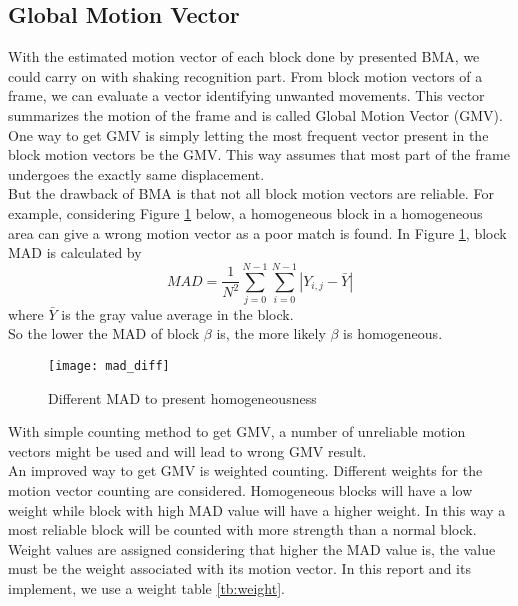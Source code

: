 \documentclass[a4paper, twocolumn]{article}
\begin{document}
	\subsection{Global Motion Vector}
	With the estimated motion vector of each block done by presented BMA, we could carry on with shaking recognition part.
	From block motion vectors of a frame, we can evaluate a vector identifying unwanted movements. This vector summarizes the motion of the frame and is called Global Motion Vector (GMV).\\
	One way to get GMV is simply letting the most frequent vector present in the block motion vectors be the GMV. This way assumes that most part of the frame undergoes the exactly same displacement. \\
	But the drawback of BMA is that not all block motion vectors are reliable. For example, considering Figure \ref{fig:mad_diff} below, a homogeneous block in a homogeneous area can give a wrong motion vector as a poor match is found. In Figure \ref{fig:mad_diff}, block MAD is calculated by
	\begin{equation}
		MAD = \frac{1}{N^2} \sum_{j=0}^{N-1} \sum_{i=0}^{N-1} | Y_{i,j} - \bar{Y} |
	\end{equation}
	where $ \bar{Y} $ is the gray value average in the block. \\
	So the lower the MAD of block $ \beta $ is, the more likely $ \beta $ is homogeneous.
	\begin{figure}[h]
	\centering
	\texttt{[image: mad\_diff]}
	\caption{Different MAD to present homogeneousness}
	\label{fig:mad_diff}
	\end{figure}
	
	\noindent
	With simple counting method to get GMV, a number of unreliable motion vectors might be used and will lead to wrong GMV result.\\
	An improved way to get GMV is weighted counting. Different weights for the motion vector counting are considered. Homogeneous blocks will have a low weight while block with high MAD value will have a higher weight. In this way a most reliable block will be counted with more strength than a normal block.\\
	Weight values are assigned considering that higher the MAD value is, the value must be the weight associated with its motion vector. In this report and its implement, we use a weight table \ref{tb:weight}.
	
\end{document}
